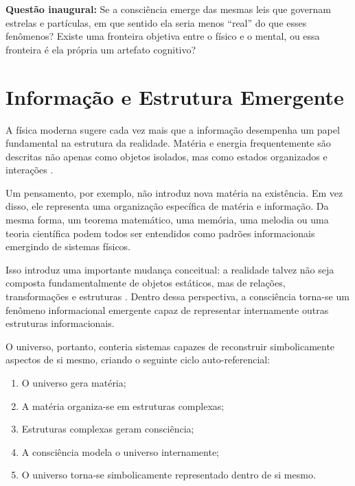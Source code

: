 \documentclass[12pt,a4paper]{article}
\begin{document}
\begin{tcolorbox}[questionbox]
  \textbf{Questão inaugural:} Se a consciência emerge das mesmas leis que
  governam estrelas e partículas, em que sentido ela seria menos ``real''
  do que esses fenômenos? Existe uma fronteira objetiva entre o físico
  e o mental, ou essa fronteira é ela própria um artefato cognitivo?
\end{tcolorbox}

\section{Informação e Estrutura Emergente}

A física moderna sugere cada vez mais que a informação desempenha um papel
fundamental na estrutura da realidade. Matéria e energia frequentemente são
descritas não apenas como objetos isolados, mas como estados organizados
e interações \citep{wheeler1990, shannon1948}.

Um pensamento, por exemplo, não introduz nova matéria na existência. Em vez
disso, ele representa uma organização específica de matéria e informação.
Da mesma forma, um teorema matemático, uma memória, uma melodia ou uma teoria
científica podem todos ser entendidos como padrões informacionais emergindo
de sistemas físicos.

Isso introduz uma importante mudança conceitual: a realidade talvez não seja
composta fundamentalmente de objetos estáticos, mas de relações,
transformações e estruturas \citep{rovelli2017}. Dentro dessa perspectiva,
a consciência torna-se um fenômeno informacional emergente capaz de representar
internamente outras estruturas informacionais.

O universo, portanto, conteria sistemas capazes de reconstruir simbolicamente
aspectos de si mesmo, criando o seguinte ciclo auto-referencial:

\begin{enumerate}
  \item O universo gera matéria;
  \item A matéria organiza-se em estruturas complexas;
  \item Estruturas complexas geram consciência;
  \item A consciência modela o universo internamente;
  \item O universo torna-se simbolicamente representado dentro de si mesmo.
\end{enumerate}
\end{document}
